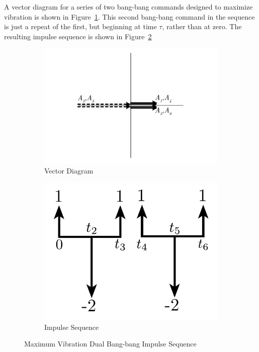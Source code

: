 A vector diagram for a series of two bang-bang commands designed to maximize vibration is shown in Figure~\ref{fig:2x_bang_bang_vector}. This second bang-bang command in the sequence is just a repeat of the first, but beginning at time $\tau$, rather than at zero. The resulting impulse sequence is shown in Figure~\ref{fig:2x_bang_bang_impulse}
% 
\begin{figure}[tb!]
  \centering
  \begin{subfigure}{0.49\textwidth}
    \centering
    \includegraphics[width=\textwidth]{Figures/Ch3/input_shaping/2x_bang_bang_vector}
    \caption{Vector Diagram}
    \label{fig:2x_bang_bang_vector}
  \end{subfigure} 
  \hfill
  \begin{subfigure}{0.4\textwidth}
    \centering
    \includegraphics[width=\textwidth]{Figures/Ch3/input_shaping/2x_bang_bang_impulses}
     \caption{Impulse Sequence}
     \label{fig:2x_bang_bang_impulse}
  \end{subfigure}
   \caption{Maximum Vibration Dual Bang-bang Impulse Sequence}
   \label{fig:2x_bang_bang}
\end{figure} 
